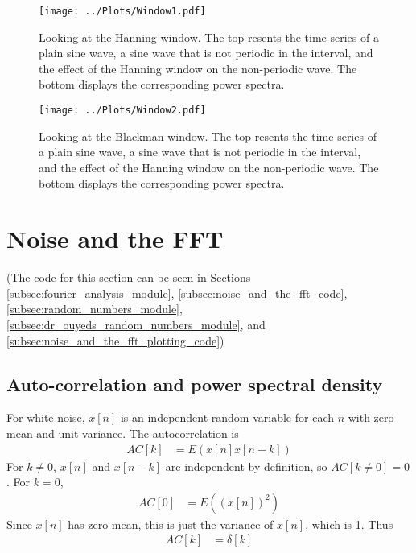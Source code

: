 \documentclass[twocolumn]{myarticle}
\begin{document}
\begin{figure*}[htb]
    \centering
    \texttt{[image: ../Plots/Window1.pdf]}
    \caption{%
        Looking at the Hanning window. The top resents the time series of a plain sine wave, a sine wave that is not periodic in the interval, and the effect of the Hanning window on the non-periodic wave. The bottom displays the corresponding power spectra.
    }
    \label{fig:Window1}
\end{figure*}

\begin{figure*}[htb]
    \centering
    \texttt{[image: ../Plots/Window2.pdf]}
    \caption{%
        Looking at the Blackman window. The top resents the time series of a plain sine wave, a sine wave that is not periodic in the interval, and the effect of the Hanning window on the non-periodic wave. The bottom displays the corresponding power spectra.
    }
    \label{fig:Window2}
\end{figure*}

\section{Noise and the FFT}
\label{sec:noise_and_the_fft}

(The code for this section can be seen in Sections \ref{subsec:fourier_analysis_module}, \ref{subsec:noise_and_the_fft_code}, \ref{subsec:random_numbers_module}, \ref{subsec:dr_ouyeds_random_numbers_module}, and \ref{subsec:noise_and_the_fft_plotting_code})

\subsection{Auto-correlation and power spectral density}
\label{subsec:auto_correlation_and_power_spectral_density}

For white noise, $ x[n] $ is an independent random variable for each $ n $ with zero mean and unit variance.
The autocorrelation is
\begin{align}
    AC[k] &= E \left( x[n] x[n-k] \right)
\end{align}
For $ k \neq 0 $, $ x[n] $ and $ x[n-k] $ are independent by definition, so $ AC[k \neq 0] = 0 $.
For $ k = 0 $,
\begin{align}
    AC[0] &= E \left( (x[n])^2 \right)
\end{align}
Since $ x[n] $ has zero mean, this is just the variance of $ x[n] $, which is 1.
Thus
\begin{align}
    AC[k] &= \delta[k]
\end{align}
\end{document}
